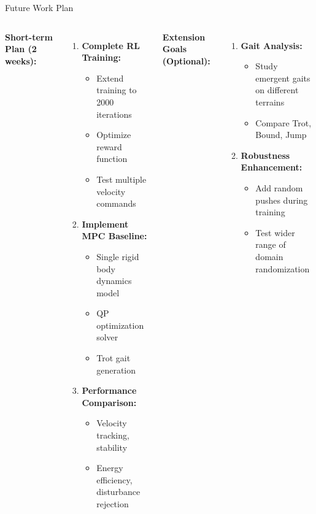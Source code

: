 \documentclass[aspectratio=169]{beamer}
\begin{document}
\begin{frame}{Future Work Plan}
\begin{columns}[T]
\textbf{Short-term Plan (2 weeks):}
\begin{enumerate}
    \item \textbf{Complete RL Training:}
    \begin{itemize}
        \item Extend training to 2000 iterations
        \item Optimize reward function
        \item Test multiple velocity commands
    \end{itemize}

    \item \textbf{Implement MPC Baseline:}
    \begin{itemize}
        \item Single rigid body dynamics model
        \item QP optimization solver
        \item Trot gait generation
    \end{itemize}

    \item \textbf{Performance Comparison:}
    \begin{itemize}
        \item Velocity tracking, stability
        \item Energy efficiency, disturbance rejection
    \end{itemize}
\end{enumerate}

\textbf{Extension Goals (Optional):}
\begin{enumerate}
    \item \textbf{Gait Analysis:}
    \begin{itemize}
        \item Study emergent gaits on different terrains
        \item Compare Trot, Bound, Jump
    \end{itemize}

    \item \textbf{Robustness Enhancement:}
    \begin{itemize}
        \item Add random pushes during training
        \item Test wider range of domain randomization
    \end{itemize}


\end{enumerate}
\end{columns}
\end{frame}
\end{document}
